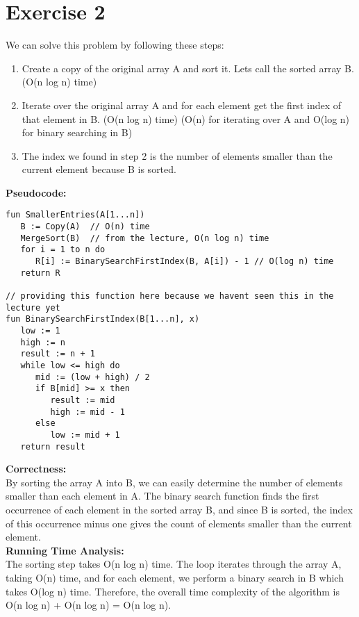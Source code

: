 \documentclass{article}
\begin{document}
\section*{Exercise 2}
We can solve this problem by following these steps:
\begin{enumerate}
   \item Create a copy of the original array A and sort it. Lets call the sorted array B. (O(n log n) time)
   \item Iterate over the original array A and for each element get the first index of that element in B. (O(n log n) time) (O(n) for iterating over A and O(log n) for binary searching in B)
   \item The index we found in step 2 is the number of elements smaller than the current element because B is sorted.
\end{enumerate}
\textbf{Pseudocode:}\\
\begin{verbatim}
fun SmallerEntries(A[1...n])
   B := Copy(A)  // O(n) time
   MergeSort(B)  // from the lecture, O(n log n) time
   for i = 1 to n do
      R[i] := BinarySearchFirstIndex(B, A[i]) - 1 // O(log n) time
   return R

// providing this function here because we havent seen this in the lecture yet
fun BinarySearchFirstIndex(B[1...n], x)
   low := 1
   high := n
   result := n + 1
   while low <= high do
      mid := (low + high) / 2
      if B[mid] >= x then
         result := mid
         high := mid - 1
      else
         low := mid + 1
   return result
\end{verbatim}
\textbf{Correctness:}\\
By sorting the array A into B, we can easily determine the number of elements smaller than each element in A. The binary search function finds the first occurrence of each element in the sorted array B, and since B is sorted, the index of this occurrence minus one gives the count of elements smaller than the current element.\\
\textbf{Running Time Analysis:}\\
The sorting step takes O(n log n) time. The loop iterates through the array A, taking O(n) time, and for each element, we perform a binary search in B which takes O(log n) time. Therefore, the overall time complexity of the algorithm is O(n log n) + O(n log n) = O(n log n).
\end{document}
